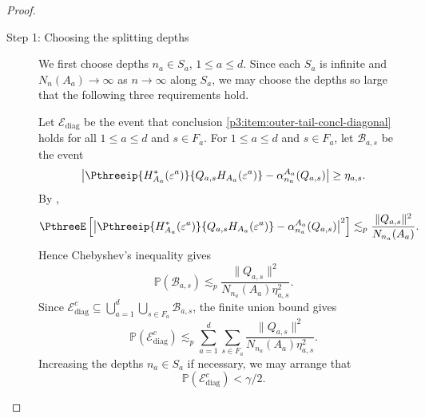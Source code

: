 \documentclass[11pt,reqno]{amsart}
\makeatletter
\theoremstyle{plain}
\theoremstyle{definition}
\newcounter{problempaper}
\newenvironment{problempaperbody}{%
  \setcounter{subsection}{0}%
  \setcounter{subsubsection}{0}%
  \setcounter{paragraph}{0}%
  \renewcommand{\thesubsection}{\arabic{subsection}}%
  \renewcommand{\thesubsubsection}{\thesubsection.\arabic{subsubsection}}%
  \renewcommand{\theparagraph}{\thesubsubsection.\arabic{paragraph}}%
  \let\problem@outersection\section
  \let\problem@outersubsection\subsection
  \let\problem@outersubsubsection\subsubsection
  \let\problem@outerparagraph\paragraph
  \let\section\problem@papersection
  \let\subsection\problem@papersubsection
  \let\subsubsection\problem@papersubsubsection
}{%
  \let\section\problem@outersection
  \let\subsection\problem@outersubsection
  \let\subsubsection\problem@outersubsubsection
  \let\paragraph\problem@outerparagraph
}
\newcommand{\problem@target}[2]{%
  \hypertarget{problem-\theproblempaper-#1-#2}{}%
}
\newcommand{\problem@paperheading}[3]{%
  \par\bigskip
  \problem@target{#1}{#2}%
  \noindent{\large\bfseries #2.\quad #3\par}%
  \nobreak\smallskip
}
\newcommand{\problem@papersubheading}[3]{%
  \par\medskip
  \problem@target{#1}{#2}%
  \noindent{\normalsize\bfseries #2.\quad #3\par}%
  \nobreak\smallskip
}
\newcommand{\problem@papersubsubheading}[3]{%
  \par\smallskip
  \problem@target{#1}{#2}%
  \noindent{\normalsize\itshape #2.\quad #3.\ }%
}
\def\problem@papersection{%
  \@ifstar{\problem@papersectionstar}{\problem@papersectionnostar}%
}
\def\problem@papersectionstar#1{%
  \par\bigskip\noindent{\large\bfseries #1\par}\nobreak\smallskip
}
\def\problem@papersectionnostar#1{%
  \refstepcounter{subsection}%
  \setcounter{subsubsection}{0}%
  \setcounter{paragraph}{0}%
  \problem@paperheading{section}{\thesubsection}{#1}%
  \problem@writecontentsline{section}{\thesubsection}{#1}%
}
\def\problem@papersubsection{%
  \@ifstar{\problem@papersubsectionstar}{\problem@papersubsectionnostar}%
}
\def\problem@papersubsectionstar#1{%
  \par\medskip\noindent{\normalsize\bfseries #1\par}\nobreak\smallskip
}
\def\problem@papersubsectionnostar#1{%
  \refstepcounter{subsubsection}%
  \setcounter{paragraph}{0}%
  \problem@papersubheading{subsection}{\thesubsubsection}{#1}%
  \problem@writecontentsline{subsection}{\thesubsubsection}{#1}%
}
\def\problem@papersubsubsection{%
  \@ifstar{\problem@papersubsubsectionstar}{\problem@papersubsubsectionnostar}%
}
\def\problem@papersubsubsectionstar#1{%
  \par\smallskip\noindent{\normalsize\itshape #1.\ }%
}
\def\problem@papersubsubsectionnostar#1{%
  \refstepcounter{paragraph}%
  \problem@papersubsubheading{subsubsection}{\theparagraph}{#1}%
  \problem@writecontentsline{subsubsection}{\theparagraph}{#1}%
}
\newcommand{\problem@writecontentsline}[3]{%
  \begingroup
  \protected@write\@auxout{}{%
    \string\problemcontentsentry{\theproblempaper}{#1}{#2}{#3}{\thepage}%
  }%
  \endgroup
}
\newcommand{\problemcontentsentry}[5]{%
  \@ifundefined{problemcontents@#1}{%
    \expandafter\gdef\csname problemcontents@#1\endcsname{}%
  }{}%
  \expandafter\g@addto@macro\csname problemcontents@#1\endcsname{%
    \problemcontentsline{#1}{#2}{#3}{#4}{#5}%
  }%
}
\newcommand{\problemcontentslink}[4]{%
  \hyperlink{problem-#1-#2-#3}{#4}%
}
\newcommand{\problemcontentsline}[5]{%
  \ifstrequal{#2}{section}{%
    \par\noindent
    \problemcontentslink{#1}{#2}{#3}{\makebox[2.5em][l]{#3}#4}%
    \nobreak\dotfill
    \problemcontentslink{#1}{#2}{#3}{#5}\par
  }{%
    \ifstrequal{#2}{subsection}{%
      \par\noindent\hspace*{1.5em}%
      \problemcontentslink{#1}{#2}{#3}{\makebox[3.5em][l]{#3}#4}%
      \nobreak\dotfill
      \problemcontentslink{#1}{#2}{#3}{#5}\par
    }{%
      \par\noindent\hspace*{3em}%
      \problemcontentslink{#1}{#2}{#3}{\makebox[4.5em][l]{#3}#4}%
      \nobreak\dotfill
      \problemcontentslink{#1}{#2}{#3}{#5}\par
    }%
  }%
}
\makeatother
\begin{document}
\begin{problempaperbody}
\begin{proof}
\begin{description}

\item[\textup{Step 1: Choosing the splitting depths}]
We first choose depths $n_a\in S_a$, $1\leq a\leq d$. Since each $S_a$ is infinite and $N_n(A_a)\to\infty$ as $n\to\infty$ along $S_a$, we may choose the depths so large that the following three requirements hold.

Let $\mathcal E_{\mathrm{diag}}$ be the event that conclusion \ref{p3:item:outer-tail-concl-diagonal} holds for all $1\leq a\leq d$ and $s\in F_a$. For $1\leq a\leq d$ and $s\in F_a$, let $\mathcal B_{a,s}$ be the event
\begin{equation*}
        \left|\Pthreeip{H_{A_a}^*(\varepsilon^a)}{Q_{a,s}H_{A_a}(\varepsilon^a)}-\alpha_{n_a}^{A_a}(Q_{a,s})\right|\geq \eta_{a,s}.
\end{equation*}
By ,
\begin{equation*}
        \PthreeE\left[\left|\Pthreeip{H_{A_a}^*(\varepsilon^a)}{Q_{a,s}H_{A_a}(\varepsilon^a)}-\alpha_{n_a}^{A_a}(Q_{a,s})\right|^2\right]\lesssim_p \frac{\|Q_{a,s}\|^2}{N_{n_a}(A_a)}.
\end{equation*}
Hence Chebyshev's inequality gives
\begin{equation*}
        \mathbb P(\mathcal B_{a,s})\lesssim_p \frac{\|Q_{a,s}\|^2}{N_{n_a}(A_a)\eta_{a,s}^2}.
\end{equation*}
Since $\mathcal E_{\mathrm{diag}}^c\subseteq\bigcup_{a=1}^d\bigcup_{s\in F_a}\mathcal B_{a,s}$, the finite union bound gives
\begin{equation*}
        \mathbb P(\mathcal E_{\mathrm{diag}}^c)\lesssim_p \sum_{a=1}^d\sum_{s\in F_a}\frac{\|Q_{a,s}\|^2}{N_{n_a}(A_a)\eta_{a,s}^2}.
\end{equation*}
Increasing the depths $n_a\in S_a$ if necessary, we may arrange that
\begin{equation*}
        \mathbb P(\mathcal E_{\mathrm{diag}}^c)<\gamma/2.
\end{equation*}


\end{description}
\end{proof}
\end{problempaperbody}
\end{document}
